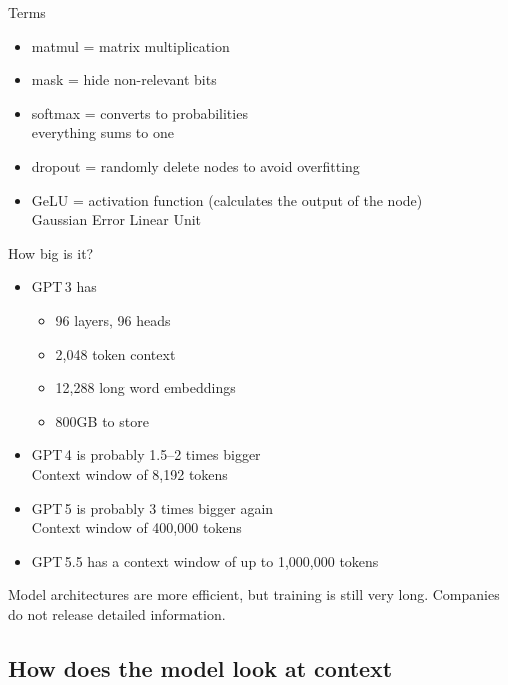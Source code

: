\begin{frame}{Terms}
\begin{itemize}
\item matmul = matrix multiplication
\item mask = hide non-relevant bits
\item softmax = converts to probabilities
  \\ everything sums to one
\item dropout = randomly delete nodes to avoid overfitting
\item GeLU = activation function (calculates the output of the node)
  \\ Gaussian Error Linear Unit

\end{itemize}
\end{frame}

\begin{frame}{How big is it?}
  \begin{itemize}
  \item GPT\,3 has
\begin{itemize}
\item 96 layers, 96 heads
\item 2,048 token context
\item  12,288 long word embeddings
\item 800GB to store
\end{itemize}
\item GPT\,4 is probably 1.5--2 times bigger
  \\ Context window of 8,192 tokens
\item GPT\,5 is probably 3 times bigger again
  \\ Context window of 400,000 tokens
\item GPT\,5.5 has a context window of up to 1,000,000 tokens  
\end{itemize}

Model architectures are more efficient, but training is still very long.   Companies do not release detailed information.

\end{frame}




\subsection{How does the model look at context}



